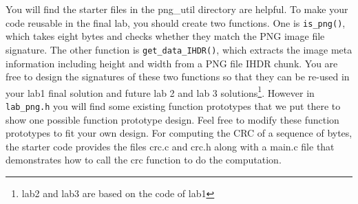 
You will find the starter files in the png\_util directory are helpful. To make your code reusable in the final lab, you should create two functions. One is \verb+is_png()+, which takes eight bytes and checks whether they match the PNG image file signature. The other function is \verb+get_data_IHDR()+, which extracts the image meta information including height and width from a PNG file IHDR chunk. You are free to design the signatures of these two functions so that they can be re-used in your lab1 final solution and future lab 2 and lab 3 solutions\footnote{lab2 and lab3 are based on the code of lab1}. However in \verb+lab_png.h+ you will find some existing function prototypes that we put there to show one possible function prototype design. Feel free to modify these function prototypes to fit your own design. For computing the CRC of a sequence of bytes, the starter code provides the files crc.c and crc.h along with a main.c file that demonstrates how to call the crc function to do the computation.

